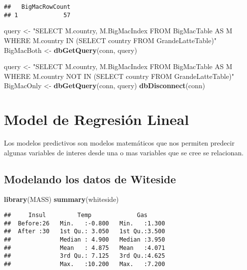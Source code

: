 \documentclass[]{article}
\newenvironment{Shaded}{\begin{snugshade}}{\end{snugshade}}
\newcommand{\KeywordTok}[1]{\textcolor[rgb]{0.13,0.29,0.53}{\textbf{#1}}}
\newcommand{\NormalTok}[1]{#1}
\newcommand{\StringTok}[1]{\textcolor[rgb]{0.31,0.60,0.02}{#1}}
\begin{document}
\begin{verbatim}
##   BigMacRowCount
## 1             57
\end{verbatim}

\begin{Shaded}
\begin{Highlighting}[]
\NormalTok{query <-}\StringTok{ "SELECT M.country, M.BigMacIndex FROM BigMacTable AS M}
\StringTok{WHERE M.country IN (SELECT country FROM GrandeLatteTable)"}
\NormalTok{BigMacBoth <-}\StringTok{ }\KeywordTok{dbGetQuery}\NormalTok{(conn, query)}
\end{Highlighting}
\end{Shaded}

\begin{Shaded}
\begin{Highlighting}[]
\NormalTok{query <-}\StringTok{ "SELECT M.country, M.BigMacIndex FROM BigMacTable AS M}
\StringTok{WHERE M.country NOT IN (SELECT country FROM GrandeLatteTable)"}
\NormalTok{BigMacOnly <-}\StringTok{ }\KeywordTok{dbGetQuery}\NormalTok{(conn, query)}
\KeywordTok{dbDisconnect}\NormalTok{(conn)}
\end{Highlighting}
\end{Shaded}

\hypertarget{model-de-regresiuxf3n-lineal}{%
\section{Model de Regresión Lineal}\label{model-de-regresiuxf3n-lineal}}

Los modelos predictivos son modelos matemáticos que nos permiten
predecir algunas variables de interes desde una o mas variables que se
cree se relacionan.

\hypertarget{modelando-los-datos-de-witeside}{%
\subsection{Modelando los datos de
Witeside}\label{modelando-los-datos-de-witeside}}

\begin{Shaded}
\begin{Highlighting}[]
\KeywordTok{library}\NormalTok{(MASS)}
\KeywordTok{summary}\NormalTok{(whiteside)}
\end{Highlighting}
\end{Shaded}

\begin{verbatim}
##     Insul         Temp             Gas       
##  Before:26   Min.   :-0.800   Min.   :1.300  
##  After :30   1st Qu.: 3.050   1st Qu.:3.500  
##              Median : 4.900   Median :3.950  
##              Mean   : 4.875   Mean   :4.071  
##              3rd Qu.: 7.125   3rd Qu.:4.625  
##              Max.   :10.200   Max.   :7.200
\end{verbatim}
\end{document}
